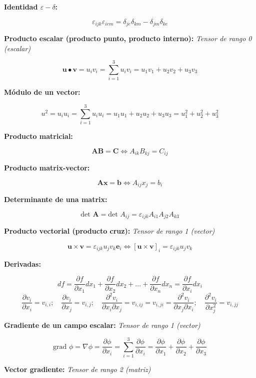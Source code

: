 \documentclass[a4paper,12pt,twoside,final,spanish]{article}
\begin{document}
\textbf{Identidad $\varepsilon-\delta$:}

\[\varepsilon_{ijk}\varepsilon_{iem}=\delta_{je}\delta_{km}-\delta_{jm}\delta_{ke}\]

\textbf{Producto escalar (producto punto, producto interno):}\textit{ Tensor de rango 0 (escalar)}

\[
\mathbf{u}\bullet\mathbf{v}=u_{i}v_{i}=\sum_{i=1}^{3}u_{i}v_{i}=u_{1}v_{1}+u_{2}v_{2}+u_{3}v_{3}
\]

\textbf{Módulo de un vector:}

\[
u^2=u_{i}u_{i}=\sum_{i=1}^{3}u_{i}u_{i}=u_{1}u_{1}+u_{2}u_{2}+u_{3}u_{3}=u_{1}^2+u_{2}^2+u_{3}^2
\]

\textbf{Producto matricial:}

\[
\mathbf{A}\mathbf{B}=\mathbf{C}\iff A_{ik}B_{kj}=C_{ij}
\]

\textbf{Producto matrix-vector:}

\[
\mathbf{A}\mathbf{x}=\mathbf{b}\iff A_{ij}x_{j}=b_{i}
\]

\textbf{Determinante de una matrix:}

\[
\text{det } \mathbf{A}=\text{det } A_{ij}=\varepsilon_{ijk}A_{i1}A_{j2}A_{k3}
\]

\textbf{Producto vectorial (producto cruz):}\textit{ Tensor de rango 1 (vector)}

\[
\mathbf{u}\times\mathbf{v}=\varepsilon_{ijk}u_{j}v_{k}\mathbf{e}_{i}\iff\left[\mathbf{u}\times\mathbf{v}\right]_{i}=\varepsilon_{ijk}u_{j}v_{k}
\]

\textbf{Derivadas:}

\[
df=\frac{\partial f}{\partial x_{1}}dx_{1}+\frac{\partial f}{\partial x_{2}}dx_{2}+\dots+\frac{\partial f}{\partial x_{n}}dx_{n}=\frac{\partial f}{\partial x_{i}}dx_{i}
\]
\[
\frac{\partial v_{i}}{\partial x_{i}}=v_{i,i};\quad
\frac{\partial v_{i}}{\partial x_{j}}=v_{i,j};\quad
\frac{\partial^{2} v_{i}}{\partial x_{i}\partial x_{j}}=v_{i,ij}=v_{i,ji}=\frac{\partial^{2} v_{i}}{\partial x_{j}\partial x_{i}};\quad
\frac{\partial^{2} v_{i}}{\partial x_{j}^{2}}=v_{i,jj}
\]

\textbf{Gradiente de un campo escalar:}\textit{ Tensor de rango 1 (vector)}

\[
\text{grad }\phi=\nabla\phi=\frac{\partial\phi}{\partial x_{i}}=\sum_{i=1}^{3}\frac{\partial\phi}{\partial x_{i}}=\frac{\partial\phi}{\partial x_{1}}+\frac{\partial\phi}{\partial x_{2}}+\frac{\partial\phi}{\partial x_{3}}
\]

\textbf{Vector gradiente:}\textit{ Tensor de rango 2 (matriz)}
\end{document}
